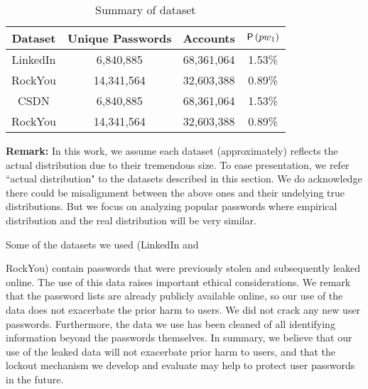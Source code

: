 {	\begin{table}[h]
		\begin{tabular}{|c|c|c|c|}
			\hline
			Dataset     & Unique Passwords & Accounts & $\mathsf{P}\left(pw_1\right)$\\ \hline
			LinkedIn &  6,840,885              &68,361,064                    &1.53\%                         \\ \hline
			RockYou  & 14,341,564                & 32,603,388                      & 0.89\%                    \\ \hline
			CSDN &  6,840,885              &68,361,064                    &1.53\%                         \\ \hline
			RockYou  & 14,341,564                & 32,603,388                      & 0.89\%                    \\ \hline
		\end{tabular}
		\caption{Summary of dataset}\label{table: datasetsummary}
		\label{Table:dataset}
		\vspace{-0.90cm}
	\end{table}
	\noindent \textbf{Remark:} In this work, we assume each dataset (approximately) reflects the actual distribution due to their tremendous size. To ease presentation, we refer ``actual distribution" to the datasets described in this section. We do acknowledge there could be misalignment between the above ones and their undelying true distributions. But we focus on analyzing popular passwords where empirical distribution and the real distribution will be very similar.
	
	 Some of the datasets we used (LinkedIn\cite{Dataset:LinkedIn} and  {RockYou\cite{Dataset:RockYou}) contain passwords that were previously stolen and subsequently leaked online. The use of this data raises important ethical considerations. We remark that the password lists are already publicly available online, so our use of the data does not exacerbate the prior harm to users. We did not crack any new user passwords. Furthermore, the data we use has been cleaned of all identifying information beyond the passwords themselves.  In summary, we believe that our use of the leaked data will not exacerbate prior harm to users, and that the lockout mechanism we develop and evaluate may help to protect user passwords in the future.
		
		
		
		
}}

